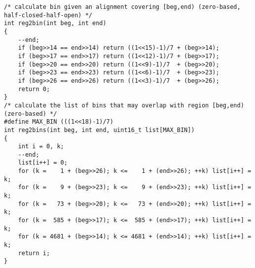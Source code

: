 \documentclass[10pt]{article}
\begin{document}
{\small
\begin{verbatim}
/* calculate bin given an alignment covering [beg,end) (zero-based, half-closed-half-open) */
int reg2bin(int beg, int end)
{
    --end;
    if (beg>>14 == end>>14) return ((1<<15)-1)/7 + (beg>>14);
    if (beg>>17 == end>>17) return ((1<<12)-1)/7 + (beg>>17);
    if (beg>>20 == end>>20) return ((1<<9)-1)/7  + (beg>>20);
    if (beg>>23 == end>>23) return ((1<<6)-1)/7  + (beg>>23);
    if (beg>>26 == end>>26) return ((1<<3)-1)/7  + (beg>>26);
    return 0;
}
/* calculate the list of bins that may overlap with region [beg,end) (zero-based) */
#define MAX_BIN (((1<<18)-1)/7)
int reg2bins(int beg, int end, uint16_t list[MAX_BIN])
{
    int i = 0, k;
    --end;
    list[i++] = 0;
    for (k =    1 + (beg>>26); k <=    1 + (end>>26); ++k) list[i++] = k;
    for (k =    9 + (beg>>23); k <=    9 + (end>>23); ++k) list[i++] = k;
    for (k =   73 + (beg>>20); k <=   73 + (end>>20); ++k) list[i++] = k;
    for (k =  585 + (beg>>17); k <=  585 + (end>>17); ++k) list[i++] = k;
    for (k = 4681 + (beg>>14); k <= 4681 + (end>>14); ++k) list[i++] = k;
    return i;
}
\end{verbatim}
}

\pagebreak
\end{document}
